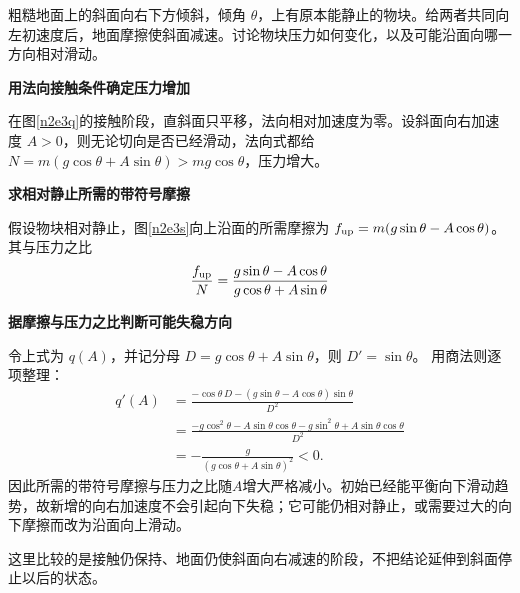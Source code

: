 \begin{question}\begin{example}[共同初速度不等于共同受力]\label{n2e3}
粗糙地面上的斜面向右下方倾斜，倾角 $\theta$，上有原本能静止的物块。给两者共同向左初速度后，地面摩擦使斜面减速。讨论物块压力如何变化，以及可能沿面向哪一方向相对滑动。
\end{example}\end{question}
\begin{solution}\textbf{用法向接触条件确定压力增加}\par\nobreak
在图\ref{n2e3q}的接触阶段，直斜面只平移，法向相对加速度为零。设斜面向右加速度 $A>0$，则无论切向是否已经滑动，法向式都给 $N=m(g\cos\theta+A\sin\theta)>mg\cos\theta$，压力增大。


\par\medskip{}\noindent\textbf{求相对静止所需的带符号摩擦}\par\nobreak
假设物块相对静止，图\ref{n2e3s}向上沿面的所需摩擦为 $f_{\rm up}=m(g\sin\theta-A\cos\theta)$。其与压力之比
\[
 \frac{f_{\rm up}}N=\frac{g\sin\theta-A\cos\theta}{g\cos\theta+A\sin\theta}
\]


\par\medskip{}\noindent\textbf{据摩擦与压力之比判断可能失稳方向}\par\nobreak
令上式为 $q(A)$，并记分母 $D=g\cos\theta+A\sin\theta$，则 $D'=\sin\theta$。
用商法则逐项整理：
\begin{align*}
q'(A)&=\frac{-\cos\theta\,D-(g\sin\theta-A\cos\theta)\sin\theta}{D^2}\\
&=\frac{-g\cos^2\theta-A\sin\theta\cos\theta
-g\sin^2\theta+A\sin\theta\cos\theta}{D^2}\\
&=-\frac g{(g\cos\theta+A\sin\theta)^2}<0.
\end{align*}
因此所需的带符号摩擦与压力之比随$A$增大严格减小。初始已经能平衡向下滑动趋势，故新增的向右加速度不会引起向下失稳；它可能仍相对静止，或需要过大的向下摩擦而改为沿面向上滑动。

这里比较的是接触仍保持、地面仍使斜面向右减速的阶段，不把结论延伸到斜面停止以后的状态。
\end{solution}

